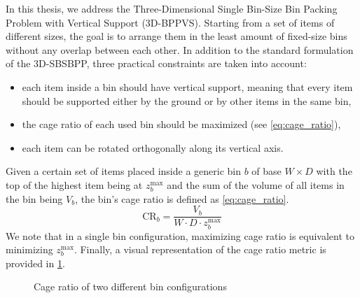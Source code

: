 In this thesis, we address the Three-Dimensional Single Bin-Size Bin Packing Problem with Vertical Support (3D-BPPVS).
Starting from a set of items of different sizes, the goal is to arrange them in the least amount of fixed-size bins without any overlap between each other.
In addition to the standard formulation of the 3D-SBSBPP, three practical constraints are taken into account:
\begin{itemize}
    \item each item inside a bin should have vertical support, meaning that every item should be supported either by the ground or by other items in the same bin,
    \item the cage ratio of each used bin should be maximized (see \cref{eq:cage_ratio}),
    \item each item can be rotated orthogonally along its vertical axis.
\end{itemize}

Given a certain set of items placed inside a generic bin $b$ of base $W \times D$ with the top of the highest item being at $z_b^\text{max}$ and the sum of the volume of all items in the bin being $V_b$, the bin's cage ratio is defined as \cref{eq:cage_ratio}.
\begin{equation}
    \label{eq:cage_ratio}
    \text{CR}_b = \frac{V_b}{W \cdot D \cdot z_b^\text{max}}
\end{equation}
We note that in a single bin configuration, maximizing cage ratio is equivalent to minimizing $z_b^\text{max}$. Finally, a visual representation of the cage ratio metric is provided in \cref{fig:cage_ratio}.

\begin{figure}[H]
    \scalebox{0.60}{%
    
    }
    \caption{Cage ratio of two different bin configurations}
    \label{fig:cage_ratio}
\end{figure}

